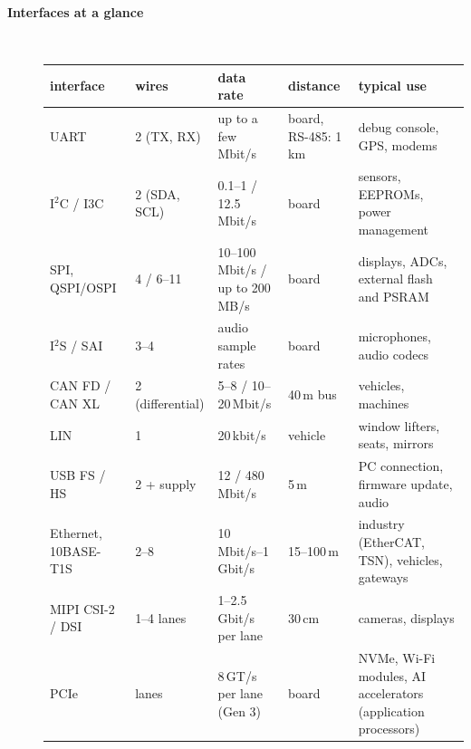 \begin{description}
\item[{\rot\bf Interfaces at a glance}]~\\[-\lblskip]
\begin{center}
{\footnotesize
\begin{tabularx}{\linewidth}{|l|>{\raggedright}p{17mm}|>{\raggedright}p{30mm}|>{\raggedright}p{19mm}|L|}
\hline
\textbf{interface} & \textbf{wires} & \textbf{data rate} & \textbf{distance} & \textbf{typical use} \\
\hline
UART & 2 (TX, RX) & up to a few Mbit/s & board, RS-485: 1\,km & debug console, GPS, modems \\
I$^2$C / I3C & 2 (SDA, SCL) & 0.1--1 / 12.5\,Mbit/s & board & sensors, EEPROMs, power management \\
SPI, QSPI/OSPI & 4 / 6--11 & 10--100\,Mbit/s / up to 200\,MB/s & board & displays, ADCs, external flash and PSRAM \\
I$^2$S / SAI & 3--4 & audio sample rates & board & microphones, audio codecs \\
CAN FD / CAN XL & 2 (differential) & 5--8 / 10--20\,Mbit/s & 40\,m bus & vehicles, machines \\
LIN & 1 & 20\,kbit/s & vehicle & window lifters, seats, mirrors \\
USB FS / HS & 2 + supply & 12 / 480\,Mbit/s & 5\,m & PC connection, firmware update, audio \\
Ethernet, 10BASE-T1S & 2--8 & 10\,Mbit/s--1\,Gbit/s & 15--100\,m & industry (EtherCAT, TSN), vehicles, gateways \\
MIPI CSI-2 / DSI & 1--4 lanes & 1--2.5\,Gbit/s per lane & 30\,cm & cameras, displays \\
PCIe & lanes & 8\,GT/s per lane (Gen 3) & board & NVMe, Wi-Fi modules, AI accelerators (application processors) \\
\hline
\end{tabularx}}
\end{center}
\os{\newpage}


\end{description}
